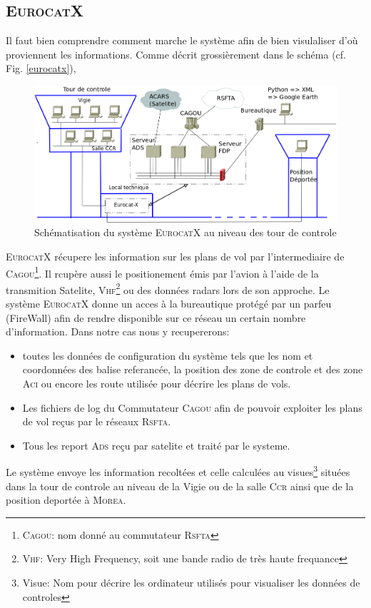     \subsection{\textsc{EurocatX}}
Il faut bien comprendre comment marche le système afin de bien visulaliser d'où proviennent les informations. Comme décrit grossièrement dans le schéma (cf. Fig. \vref{eurocatx}),
\begin{figure}
    \center
    \includegraphics[width=15cm]{images/SchemaControle.png}
    \caption{Schématisation du système \textsc{EurocatX} au niveau des tour de controle}
    \label{eurocatx}
\end{figure}
\textsc{EurocatX} récupere les information sur les plans de vol par l'intermediaire de \textsc{Cagou}\footnote{\textsc{Cagou}: nom donné au commutateur \textsc{Rsfta}}. Il rcupère aussi le positionement émis par l'avion à l'aide de la transmition Satelite, \textsc{Vhf}\footnote{\textsc{Vhf}: Very High Frequency, soit une bande radio de très haute frequance} ou des données radars lors de son approche. Le système \textsc{EurocatX} donne un acces à la bureautique protégé par un parfeu (FireWall) afin de rendre disponible sur ce réseau un certain nombre d'information. Dans notre cas nous y recupererons:
\begin{itemize}
    \item toutes les données de configuration du système tels que les nom et coordonnées des balise referancée, la position des zone de controle et des zone \textsc{Aci} ou encore les route utilisée pour décrire les plans de vols.
    \item Les fichiers de log du Commutateur \textsc{Cagou} afin de pouvoir exploiter les plans de vol reçus par le réseaux \textsc{Rsfta}.
    \item Tous les report \textsc{Ads} reçu par satelite et traité par le systeme.
\end{itemize} 
Le système envoye les information recoltées et celle calculées au visues\footnote{Visue: Nom pour décrire les ordinateur utilisés pour visualiser les données de controles} situées dans la tour de controle au niveau de la Vigie ou de la salle \textsc{Ccr} ainsi que de la position deportée à \textsc{Morea}.

